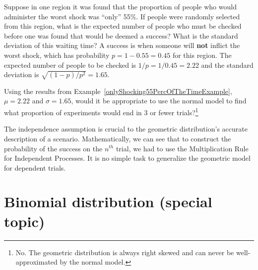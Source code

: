 \begin{example}{Suppose in one region it was found that the proportion of people who would administer the worst shock was ``only'' 55\%. If people were randomly selected from this region, what is the expected number of people who must be checked before one was found that would be deemed a success? What is the standard deviation of this waiting time?} \label{onlyShocking55PercOfTheTimeExample}
A success is when someone will \textbf{not} inflict the worst shock, which has probability $p=1-0.55=0.45$ for this region. The expected number of people to be checked is $1/p = 1/0.45 = 2.22$ and the standard deviation is $\sqrt{(1-p)/p^2} = 1.65$.
\end{example}

\begin{exercise}
Using the results from Example~\ref{onlyShocking55PercOfTheTimeExample}, $\mu = 2.22$ and $\sigma = 1.65$, would it be appropriate to use the normal model to find what proportion of experiments would end in 3 or fewer trials?\footnote{No. The geometric distribution is always right skewed and can never be well-approximated by the normal model.}
\end{exercise}

The independence assumption is crucial to the geometric distribution's accurate description of a scenario. Mathematically, we can see that to construct the probability of the success on the $n^{th}$ trial, we had to use the Multiplication Rule for Independent Processes. It is no simple task to generalize the geometric model for dependent trials.




\section{Binomial distribution (special topic)}
\label{binomialModel}


